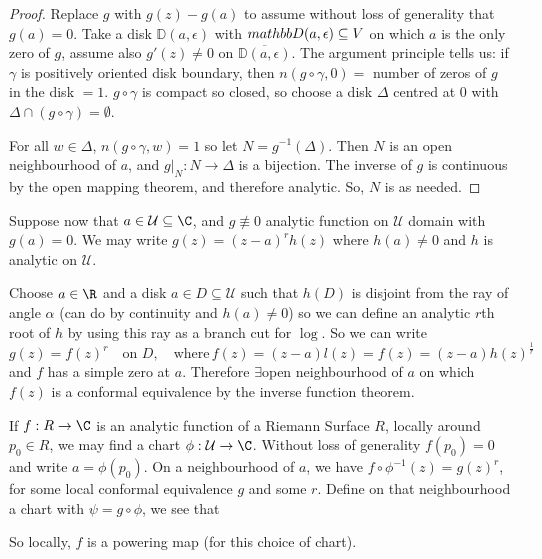 \documentclass{article}
\begin{document}
\begin{proof}
    Replace $g$ with $g(z) - g(a)$ to assume without loss of generality that $g(a) = 0$.
    Take a disk $\mathbb{D}(a, \epsilon)$ with $\\mathbb{D}(a, \epsilon) \subseteq V$ on which $a$ is the only zero of $g$, assume also $g'(z) \neq 0$ on $\overline{\mathbb{D}(a, \epsilon)}$.
    The argument principle tells us: if $\gamma$ is positively oriented disk boundary, then $n(g \circ \gamma, 0) =$ number of zeros of $g$ in the disk $ = 1$.
    $g \circ \gamma$ is compact so closed, so choose a disk $\Delta$ centred at 0 with $\Delta \cap (g \circ \gamma) = \emptyset$.

    For all $w \in \Delta$, $n(g \circ \gamma, w) = 1$ so let $N = g^{-1} (\Delta)$.
    Then $N$ is an open neighbourhood of $a$, and $g|_N:N \to \Delta$ is a bijection.
    The inverse of $g$ is continuous by the open mapping theorem, and therefore analytic.
    So, $N$ is as needed.
\end{proof}

Suppose now that $a \in \mathcal{U} \subseteq \C$, and $g \not\equiv 0$ analytic function on $\mathcal{U}$ domain with $g(a) = 0$. We may write $g(z) = (z-a)^r h(z)$ where $h(a) \neq 0$ and $h$ is analytic on $\mathcal{U}$.

Choose $a \in \R$ and a disk $a \in D \subseteq \mathcal{U}$ such that $h(D)$ is disjoint from the ray of angle $\alpha$ (can do by continuity and $h(a) \neq 0$) so we can define an analytic $r$th root of $h$ by using this ray as a branch cut for $\log$. So we can write
\begin{equation}
    g(z) = f(z)^r \quad \text{on $D$}, \quad \text{where} \, f(z) = (z-a) l(z) = f(z) = (z-a) h(z)^{\frac{1}{r}}
\end{equation}
and $f$ has a simple zero at $a$. Therefore $\exists$open neighbourhood of $a$ on which $f(z)$ is a conformal equivalence by the inverse function theorem.

If $f: R \to \C$ is an analytic function of a Riemann Surface $R$, locally around $p_0 \in R$, we may find a chart $\phi: \mathcal{U} \to \C$. Without loss of generality $f(p_0)= 0$ and write $a = \phi(p_0)$.
On a neighbourhood of $a$, we have $f \circ \phi^{-1}(z) = g(z)^r$, for some local conformal equivalence $g$ and some $r$. Define on that neighbourhood a chart with $\psi = g \circ \phi$, we see that

So locally, $f$ is a powering map (for this choice of chart).
\end{document}

